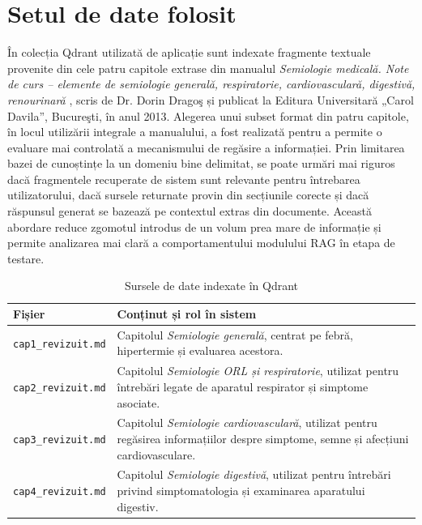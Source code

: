 \documentclass[12pt, a4paper, oneside, romanian]{teza-upb}
\begin{document}
\section{Setul de date folosit}

În colecția Qdrant utilizată de aplicație sunt indexate fragmente textuale provenite din cele patru capitole extrase din  manualul \textit{Semiologie medicală. Note de curs -- elemente de semiologie generală, respiratorie, cardiovasculară, digestivă, renourinară} \cite{dragos_semiologie_curs_2013}, scris de Dr. Dorin Dragoş și publicat la Editura Universitară „Carol Davila”, Bucureşti, în anul 2013.
Alegerea unui subset format din patru capitole, în locul utilizării integrale a manualului, a fost realizată pentru a permite o evaluare mai controlată a mecanismului de regăsire a informației. Prin limitarea bazei de cunoștințe la un domeniu bine delimitat, se poate urmări mai riguros dacă fragmentele recuperate de sistem sunt relevante pentru întrebarea utilizatorului, dacă sursele returnate provin din secțiunile corecte și dacă răspunsul generat se bazează pe contextul extras din documente. Această abordare reduce zgomotul introdus de un volum prea mare de informație și permite analizarea mai clară a comportamentului modulului RAG în etapa de testare.

\begin{table}[H]
\centering
\small
\begin{tabular}{|p{4.4cm}|p{9.2cm}|}
\hline
\textbf{Fișier} & \textbf{Conținut și rol în sistem} \\
\hline
\texttt{cap1\_revizuit.md} & Capitolul \textit{Semiologie generală}, centrat pe febră, hipertermie și evaluarea acestora. \\
\hline
\texttt{cap2\_revizuit.md} & Capitolul \textit{Semiologie ORL și respiratorie}, utilizat pentru întrebări legate de aparatul respirator și simptome asociate. \\
\hline
\texttt{cap3\_revizuit.md} & Capitolul \textit{Semiologie cardiovasculară}, utilizat pentru regăsirea informațiilor despre simptome, semne și afecțiuni cardiovasculare. \\
\hline
\texttt{cap4\_revizuit.md} & Capitolul \textit{Semiologie digestivă}, utilizat pentru întrebări privind simptomatologia și examinarea aparatului digestiv. \\
\hline
\end{tabular}
\caption{Sursele de date indexate în Qdrant}
\end{table}
\end{document}
